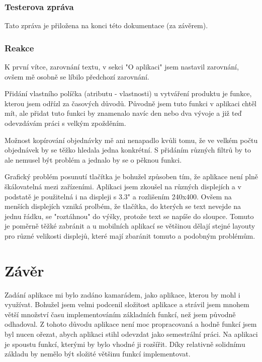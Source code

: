 \documentclass[12pt]{report}
\begin{document}
\subsection{Testerova zpráva}
Tato zpráva je přiložena na konci této dokumentace (za závěrem).
\subsection{Reakce}
K první vítce, zarovnání textu, v sekci "O aplikaci" jsem nastavil zarovnání, ovšem mě osobně se
líbilo předchozí zarovnání.

Přidání vlastního políčka (atributu - vlastnosti) u vytváření produktu je funkce, kterou jsem
odřízl za časových důvodů. 
Původně jsem tuto funkci v aplikaci chtěl mít, ale přidat tuto funkci by znamenalo navíc den nebo dva
vývoje a již teď odevzdávám práci s velkým zpožděním.

Možnost kopírování objednávky mě ani nenapadlo kvůli tomu, že ve velkém počtu objednávek by se těžko
hledala jedna konkrétní. S přidáním různých filtrů by to ale nemusel být problém a jednalo by se o
pěknou funkci.

Grafický problém posunutí tlačítka je bohužel způsoben tím, že aplikace není plně škálovatelná mezi
zařízeními. Aplikaci jsem zkoušel na různých displejích a v podstatě je použitelná i na displeji s
3.3" a rozlišením 240x400. Ovšem na menších displejích vzniká prolbém, že tlačítka, do kterých se text
nevejde na jednu řádku, se "roztáhnou" do výšky, protože text se napíše do sloupce. Tomuto je poměrně 
těžké zabránit a u mobilních aplikací se většinou dělají stejné layouty pro různé velikosti displejů,
které mají zbaránit tomuto a podobným problémům.
%
\chapter{Závěr}
Zadání aplikace mi bylo zadáno kamarádem, jako aplikace, kterou by mohl i využívat. Bohužel jsem velmi podcenil
složitost aplikace a strávil jsem mnohem větší množství času implementováním základních funkcí, než
jsem původně odhadoval. Z tohoto důvodu aplikace není moc propracovaná a hodně funkcí jsem byl nucen
ořezat, abych aplikaci stihl odevzdat jako semestrální práci. Na aplikaci je spoustu funkcí, kterými 
by bylo vhodné ji rozšířit. Díky relativně solidnímu základu by nemělo být složité většinu funkcí
implementovat.


%
\end{document}
